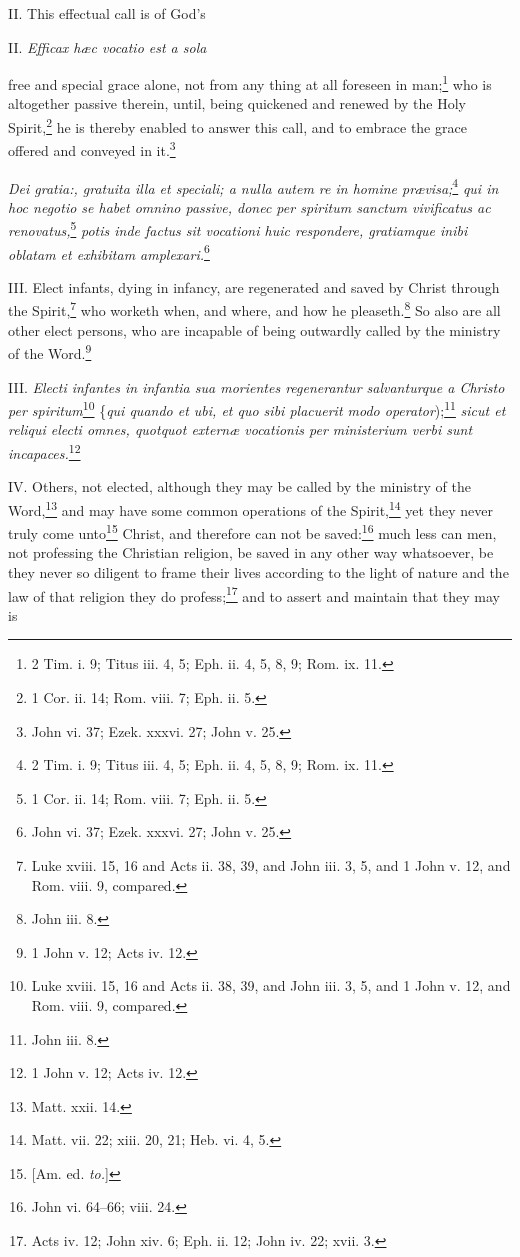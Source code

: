 II. This effectual call is of God's

II. \emph{Efficax hæc vocatio est a sola }

free and special grace alone, not from any thing at all foreseen in man;\footnote{2 Tim. i. 9; Titus iii. 4, 5; Eph. ii. 4, 5, 8, 9; Rom. ix. 11.} who is altogether passive therein, until, being quickened and renewed by the Holy Spirit,\footnote{1 Cor. ii. 14; Rom. viii. 7; Eph. ii. 5.} he is thereby enabled to answer this call, and to embrace the grace offered and conveyed in it.\footnote{John vi. 37; Ezek. xxxvi. 27; John v. 25.}

\emph{Dei gratia:, gratuita illa et speciali; a nulla autem re in homine prævisa;}\footnote{2 Tim. i. 9; Titus iii. 4, 5; Eph. ii. 4, 5, 8, 9; Rom. ix. 11.}\emph{ qui in hoc negotio se habet omnino passive, donec per spiritum sanctum vivificatus ac renovatus,}\footnote{1 Cor. ii. 14; Rom. viii. 7; Eph. ii. 5.}\emph{ potis inde factus sit vocationi huic respondere, gratiamque inibi oblatam et exhibitam amplexari.}\footnote{John vi. 37; Ezek. xxxvi. 27; John v. 25.}

III. Elect infants, dying in infancy, are regenerated and saved by Christ through the Spirit,\footnote{Luke xviii. 15, 16 and Acts ii. 38, 39, and John iii. 3, 5, and 1 John v. 12, and Rom. viii. 9, compared.} who worketh when, and where, and how he pleaseth.\footnote{John iii. 8.} So also are all other elect persons, who are incapable of being outwardly called by the ministry of the Word.\footnote{1 John v. 12; Acts iv. 12.}

III. \emph{Electi infantes in infantia sua morientes regenerantur salvanturque a Christo per spiritum}\footnote{Luke xviii. 15, 16 and Acts ii. 38, 39, and John iii. 3, 5, and 1 John v. 12, and Rom. viii. 9, compared.} \{\emph{qui quando et ubi, et quo sibi placuerit modo operator});\footnote{John iii. 8.}\emph{ sicut et reliqui electi omnes, quotquot externæ vocationis per ministerium verbi sunt incapaces.}\footnote{1 John v. 12; Acts iv. 12.}

IV. Others, not elected, although they may be called by the ministry of the Word,\footnote{Matt. xxii. 14.} and may have some common operations of the Spirit,\footnote{Matt. vii. 22; xiii. 20, 21; Heb. vi. 4, 5.} yet they never truly come unto\footnote{[Am. ed. \emph{to.}]} Christ, and therefore can not be saved:\footnote{John vi. 64–66; viii. 24.} much less can men, not professing the Christian religion, be saved in any other way whatsoever, be they never so diligent to frame their lives according to the light of nature and the law of that religion they do profess;\footnote{Acts iv. 12; John xiv. 6; Eph. ii. 12; John iv. 22; xvii. 3.} and to assert and maintain that they may is

